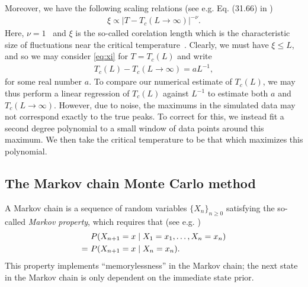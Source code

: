 \documentclass[english,notitlepage,reprint]{revtex4-2}  %
\begin{document}
Moreover, we have the following scaling relations (see e.g. Eq. (31.66) in \cite{IntroStatMekSwendsen})
\begin{align}
    \xi \propto |T - T_c(L\rightarrow\infty)|^{-\nu}.   \label{eq:xi}
\end{align}
Here, \(\nu = 1\)~\cite{Note8} and \(\xi\) is the so-called corelation length which is the characteristic size of fluctuations near the critical temperature~\cite[p. 437]{IntroStatMekSwendsen}. Clearly, we must have \(\xi\leq L\), and so we may consider \eqref{eq:xi} for \(T=T_c(L)\) and write 
\begin{align}
    T_c(L) - T_c(L\rightarrow \infty) = aL^{-1},    \label{eq:scaling_relations}
\end{align}
for some real number \(a\). To compare our numerical estimate of \(T_c(L)\), we may thus perform a linear regression of \(T_c(L)\) against \(L^{-1}\) to estimate both \(a\) and \(T_c(L\rightarrow\infty)\).
However, due to noise, the maximums in the simulated data may not correspond exactly to the true peaks.
To correct for this, we instead fit a second degree polynomial to a small window of data points around this maximum.
We then take the critical temperature to be that which maximizes this polynomial.




\subsection{The Markov chain Monte Carlo method}    \label{sec:MCMC}
A Markov chain is a sequence of random variables \(\{X_n\}_{n\geq 0}\) satisfying the so-called \emph{Markov property}, which requires that (see e.g. \cite{markov_property_sciencedirect})
\begin{align}
    &P(X_{n+1} = x \mid X_1 = x_1, \ldots, X_n = x_n) \notag \\
    = \ 
    &P(X_{n+1} = x \mid X_n = x_n).    \label{eq:markov_property}
\end{align}
This property implements ``memorylessness'' in the Markov chain; the next state in the Markov chain is only dependent on the immediate state prior.
\end{document}
